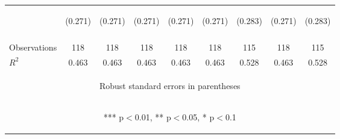 \begin{center}
\begin{tabular}{lcccccccc}
 & \begin{footnotesize}(0.271)\end{footnotesize} & \begin{footnotesize}(0.271)\end{footnotesize} & \begin{footnotesize}(0.271)\end{footnotesize} & \begin{footnotesize}(0.271)\end{footnotesize} & \begin{footnotesize}(0.271)\end{footnotesize} & \begin{footnotesize}(0.283)\end{footnotesize} & \begin{footnotesize}(0.271)\end{footnotesize} & \begin{footnotesize}(0.283)\end{footnotesize} \\
\vspace{4pt} & \begin{footnotesize}\end{footnotesize} & \begin{footnotesize}\end{footnotesize} & \begin{footnotesize}\end{footnotesize} & \begin{footnotesize}\end{footnotesize} & \begin{footnotesize}\end{footnotesize} & \begin{footnotesize}\end{footnotesize} & \begin{footnotesize}\end{footnotesize} & \begin{footnotesize}\end{footnotesize} \\
Observations & 118 & 118 & 118 & 118 & 118 & 115 & 118 & 115 \\
 $R^2$ & 0.463 & 0.463 & 0.463 & 0.463 & 0.463 & 0.528 & 0.463 & 0.528 \\ \hline
\multicolumn{9}{c}{\begin{footnotesize} Robust standard errors in parentheses\end{footnotesize}} \\
\multicolumn{9}{c}{\begin{footnotesize} *** p$<$0.01, ** p$<$0.05, * p$<$0.1\end{footnotesize}} \\
\end{tabular}
\end{center}
